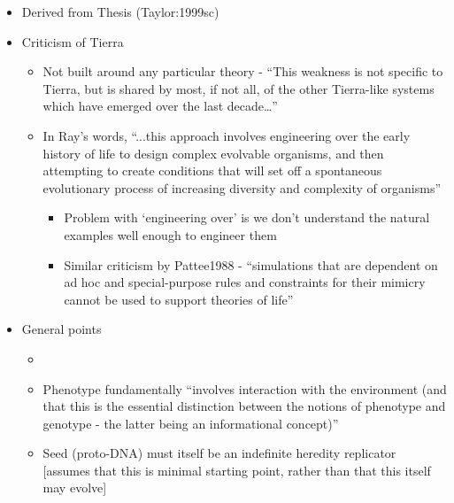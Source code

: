 \begin{itemize}
	\item 	
	Derived from Thesis (Taylor:1999sc)
	\item	
	Criticism of Tierra
	\begin{itemize}
		\item
		
		Not built around any particular theory - ``This weakness is not
		specific to Tierra, but is shared by most, if not all, of the other
		Tierra-like systems which have emerged over the last
		decade\ldots{}''
		
		\item
		
		In Ray's words, ``...this approach involves engineering over the
		early history of life to design complex evolvable organisms, and
		then attempting to create conditions that will set off a spontaneous
		evolutionary process of increasing diversity and complexity of
		organisms''
		
		
		\begin{itemize}
			\item
			
			Problem with `engineering over' is we don't understand the natural
			examples well enough to engineer them
			
			\item
			
			Similar criticism by Pattee1988 - ``simulations that are dependent
			on ad hoc and special-purpose rules and constraints for their
			mimicry cannot be used to support theories of life''
			
		\end{itemize}
	\end{itemize}
	\item
	
	General points
		
	\begin{itemize}
		\item
		
		
		\item
		
		Phenotype fundamentally ``involves interaction with the environment
		(and that this is the essential distinction between the notions of
		phenotype and genotype - the latter being an informational
		concept)''
		
		\item
		
		Seed (proto-DNA) must itself be an indefinite heredity replicator
		{[}assumes that this is minimal starting point, rather than that
		this itself may evolve{]}
		

\end{itemize}
\end{itemize}
